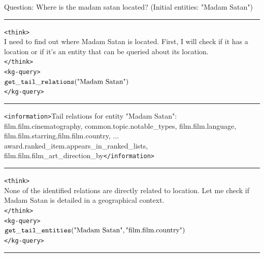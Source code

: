 \begin{table}[H]
\centering
\caption{Example \framework{} response in . \textcolor{blue}{Blue} denotes responses generated by the \framework{} agent.}
\begin{reasonbox}[title=\framework{} Response Example - \dataset{SimpleQA}]
Question: Where is the madam satan located? (Initial entities: "Madam Satan") \\
\vspace{0.5em}\hrule\vspace{0.5em}
\begin{blueblock}
\texttt{<think>} \\
I need to find out where Madam Satan is located. First, I will check if it has a location or if it's an entity that can be queried about its location. \\
\texttt{</think>} \\
\texttt{<kg-query>} \\
$\mathtt{get\_tail\_relations}(\text{"Madam Satan"})$ \\
\texttt{</kg-query>}
\end{blueblock}

\vspace{0.5em}\hrule\vspace{0.5em}

\texttt{<information>}Tail relations for entity "Madam Satan": \\
film.film.cinematography, common.topic.notable\_types, film.film.language, 
film.film.starring,film.film.country,   ... award.ranked\_item.appears\_in\_ranked\_lists,  
film.film.film\_art\_direction\_by\texttt{</information>}

\vspace{0.5em}\hrule\vspace{0.5em}

\begin{blueblock}
\texttt{<think>} \\
None of the identified relations are directly related to location. Let me check if Madam Satan is detailed in a geographical context. \\
\texttt{</think>} \\
\texttt{<kg-query>} \\
$\mathtt{get\_tail\_entities}(\text{"Madam Satan"}, \text{"film.film.country"})$ \\
\texttt{</kg-query>}
\end{blueblock}

\vspace{0.5em}\hrule\vspace{0.5em}


\end{reasonbox}
\end{table}
